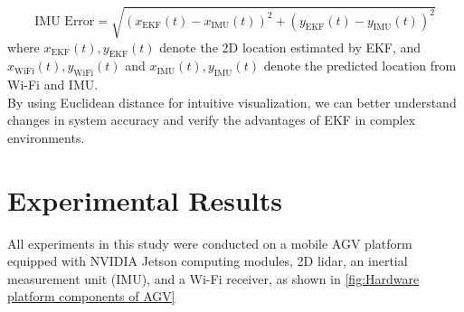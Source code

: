 \documentclass[12pt,a4paper]{article}
\numberwithin{equation}{section}
\begin{document}
\begin{equation}
\text{IMU Error} = \sqrt{(x_{\text{EKF}}(t) - x_{\text{IMU}}(t))^2 + (y_{\text{EKF}}(t) - y_{\text{IMU}}(t))^2}
\end{equation}
\noindent where \( x_{\text{EKF}}(t), y_{\text{EKF}}(t) \) denote the 2D location estimated by EKF, and \( x_{\text{WiFi}}(t), y_{\text{WiFi}}(t) \) and \( x_{\text{IMU}}(t), y_{\text{IMU}}(t) \) denote the predicted location from Wi-Fi and IMU.\\
By using Euclidean distance for intuitive visualization, we can better understand changes in system accuracy and verify the advantages of EKF in complex environments.

\section{Experimental Results}
All experiments in this study were conducted on a mobile AGV platform equipped with NVIDIA Jetson computing modules, 2D lidar, an inertial measurement unit (IMU), and a Wi-Fi receiver, as shown in \autoref{fig:Hardware platform components of AGV}
\end{document}
